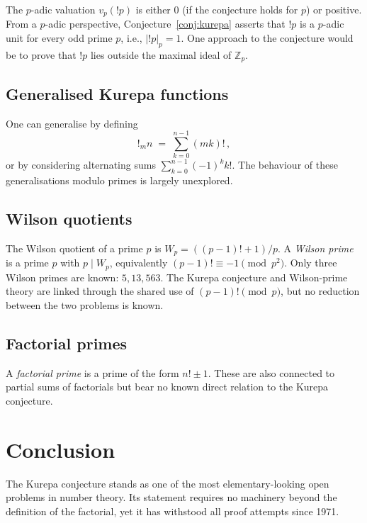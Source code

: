 \documentclass[12pt,a4paper]{amsart}
\theoremstyle{definition}
\newcommand{\Z}{\mathbb{Z}}
\begin{document}
The $p$-adic valuation $v_p(!p)$ is either $0$ (if the conjecture holds
for $p$) or positive.
From a $p$-adic perspective, Conjecture~\ref{conj:kurepa} asserts that $!p$
is a $p$-adic unit for every odd prime $p$, i.e., $|!p|_p = 1$.
One approach to the conjecture would be to prove that $!p$ lies outside
the maximal ideal of $\Z_p$.

\subsection{Generalised Kurepa functions}

One can generalise by defining
\[
  !_m n \;=\; \sum_{k=0}^{n-1} (mk)!\,,
\]
or by considering alternating sums $\sum_{k=0}^{n-1} (-1)^k k!$.
The behaviour of these generalisations modulo primes is largely unexplored.

\subsection{Wilson quotients}

The Wilson quotient of a prime $p$ is $W_p = ((p-1)! + 1)/p$.
A \emph{Wilson prime} is a prime $p$ with $p \mid W_p$,
equivalently $(p-1)! \equiv -1 \pmod{p^2}$.
Only three Wilson primes are known: $5, 13, 563$.
The Kurepa conjecture and Wilson-prime theory are linked through the shared
use of $(p-1)! \pmod p$, but no reduction between the two problems is known.

\subsection{Factorial primes}

A \emph{factorial prime} is a prime of the form $n! \pm 1$.
These are also connected to partial sums of factorials but bear no known
direct relation to the Kurepa conjecture.

\section{Conclusion}
\label{sec:conclusion}

The Kurepa conjecture stands as one of the most elementary-looking open
problems in number theory.
Its statement requires no machinery beyond the definition of the factorial,
yet it has withstood all proof attempts since 1971.
\end{document}
